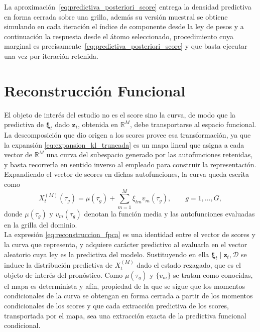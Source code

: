La aproximación~\eqref{eq:predictiva_posteriori_score} entrega la densidad predictiva en forma cerrada sobre una grilla, además su versión muestral se obtiene simulando en cada iteración el índice de componente desde la ley de pesos y a continuación la respuesta desde el átomo seleccionado, procedimiento cuya marginal es precisamente~\eqref{eq:predictiva_posteriori_score} y que basta ejecutar una vez por iteración retenida.


\section{Reconstrucción Funcional}
\label{03_05_00_reconstruccion_funcional}

El objeto de interés del estudio no es el score sino la curva, de modo que la predictiva de $\boldsymbol{\xi}_t$ dado $\mathbf{z}_t$, obtenida en $\mathbb{R}^{M}$, debe transportarse al espacio funcional. La descomposición que dio origen a los scores provee esa transformación, ya que la expansión \eqref{eq:expansion_kl_truncada} es un mapa lineal que asigna a cada vector de $\mathbb{R}^{M}$ una curva del subespacio generado por las autofunciones retenidas, y basta recorrerla en sentido inverso al empleado para construir la representación. Expandiendo el vector de scores en dichas autofunciones, la curva queda escrita como
\begin{equation}\label{eq:reconstruccion_fpca}
    X_t^{(M)}(\tau_g) = \mu(\tau_g)
    + \sum_{m=1}^{M} \xi_{tm}v_m(\tau_g),
    \qquad g = 1, \dots, G,
\end{equation}
donde $\mu(\tau_g)$ y $v_m(\tau_g)$ denotan la función media y las autofunciones evaluadas en la grilla del dominio.\\

La expresión \eqref{eq:reconstruccion_fpca} es una identidad entre el vector de scores y la curva que representa, y adquiere carácter predictivo al evaluarla en el vector aleatorio cuya ley es la predictiva del modelo. Sustituyendo en ella $\boldsymbol{\xi}_t \mid \mathbf{z}_t, \mathcal{D}$ se induce la distribución predictiva de $X_t^{(M)}$ dado el estado rezagado, que es el objeto de interés del pronóstico. Como $\mu(\tau_g)$ y $\{v_m\}$ se tratan como conocidas, el mapa es determinista y afín, propiedad de la que se sigue que los momentos condicionales de la curva se obtengan en forma cerrada a partir de los momentos condicionales de los scores y que cada extracción predictiva de los scores, transportada por el mapa, sea una extracción exacta de la predictiva funcional condicional.\\



